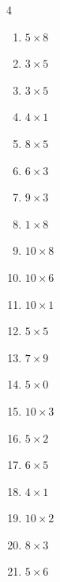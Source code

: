 \begin{multicols}{4}
\begin{enumerate}
  \item $5\times 8$
        \phantom{$=40$}

  \item $3\times 5$
        \phantom{$=15$}

  \item $3\times 5$
        \phantom{$=15$}

  \item $4\times 1$
        \phantom{$=4$}

  \item $8\times 5$
        \phantom{$=40$}

  \item $6\times 3$
        \phantom{$=18$}

  \item $9\times 3$
        \phantom{$=27$}

  \item $1\times 8$
        \phantom{$=8$}

  \item $10\times 8$
        \phantom{$=80$}

\columnbreak %

  \item $10\times 6$
        \phantom{$=60$}

  \item $10\times 1$
        \phantom{$=10$}

  \item $5\times 5$
        \phantom{$=25$}

  \item $7\times 9$
        \phantom{$=63$}

  \item $5\times 0$
        \phantom{$=0$}

  \item $10\times 3$
        \phantom{$=30$}

  \item $5\times 2$
        \phantom{$=10$}

  \item $6\times 5$
        \phantom{$=30$}

  \item $4\times 1$
        \phantom{$=4$}

  \item $10\times 2$
        \phantom{$=20$}

  \item $8\times 3$
        \phantom{$=24$}

  \item $5\times 6$
        \phantom{$=30$}


\end{enumerate}
\end{multicols}
